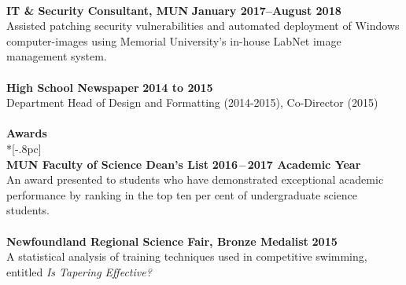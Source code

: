 \documentclass[letterpaper]{article}
\let\dateshape\bf
\begin{document}
\\
{\bf IT \& Security Consultant, MUN} \hfill {\dateshape January 2017--August 2018\/} \\
Assisted patching security vulnerabilities and automated deployment of Windows 
computer-images using Memorial University's in-house LabNet image management system. \\
\\
{\bf High School Newspaper} \hfill {\dateshape 2014 to 2015\/} \\
Department Head of Design and Formatting (2014-2015), Co-Director (2015)  \\
\\[0.5pc] %
{\large \bf Awards} \\*[-.8pc]
\underline{\hspace{\textwidth}} \\[0.5pc]
{\bf MUN Faculty of Science Dean's List} \hfill {\dateshape 2016\,--\,2017 Academic Year} \\
An award presented to students who have demonstrated exceptional academic performance by ranking in the top ten per cent of undergraduate science students. \\
\\
{\bf Newfoundland Regional Science Fair, Bronze Medalist} \hfill {\dateshape 2015\/} \\
A statistical analysis of training techniques used in competitive swimming, 
entitled {\it Is Tapering Effective?} \\
\\[0.5pc] 
\end{document}
